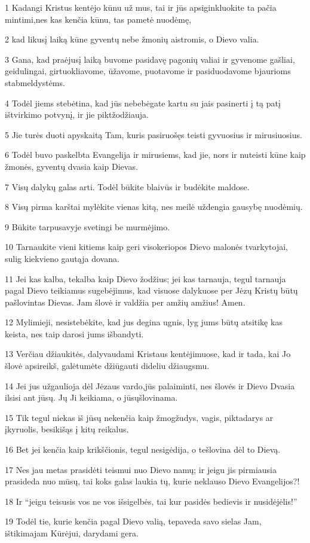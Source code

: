 \par 1 Kadangi Kristus kentėjo kūnu už mus, tai ir jūs apsiginkluokite ta pačia mintimi,­nes kas kenčia kūnu, tas pametė nuodėmę, 
\par 2 kad likusį laiką kūne gyventų nebe žmonių aistromis, o Dievo valia. 
\par 3 Gana, kad praėjusį laiką buvome pasidavę pagonių valiai ir gyvenome gašliai, geidulingai, girtuokliavome, ūžavome, puotavome ir pasiduodavome bjaurioms stabmeldystėms. 
\par 4 Todėl jiems stebėtina, kad jūs nebebėgate kartu su jais pasinerti į tą patį ištvirkimo potvynį, ir jie piktžodžiauja. 
\par 5 Jie turės duoti apyskaitą Tam, kuris pasiruošęs teisti gyvuosius ir mirusiuosius. 
\par 6 Todėl buvo paskelbta Evangelija ir mirusiems, kad jie, nors ir nuteisti kūne kaip žmonės, gyventų dvasia kaip Dievas. 
\par 7 Visų dalykų galas arti. Todėl būkite blaivūs ir budėkite maldose. 
\par 8 Visų pirma karštai mylėkite vienas kitą, nes meilė uždengia gausybę nuodėmių. 
\par 9 Būkite tarpusavyje svetingi be murmėjimo. 
\par 10 Tarnaukite vieni kitiems kaip geri visokeriopos Dievo malonės tvarkytojai, sulig kiekvieno gautąja dovana. 
\par 11 Jei kas kalba, tekalba kaip Dievo žodžius; jei kas tarnauja, tegul tarnauja pagal Dievo teikiamus sugebėjimus, kad visuose dalykuose per Jėzų Kristų būtų pašlovintas Dievas. Jam šlovė ir valdžia per amžių amžius! Amen. 
\par 12 Mylimieji, nesistebėkite, kad jus degina ugnis, lyg jums būtų atsitikę kas keista, nes taip darosi jums išbandyti. 
\par 13 Verčiau džiaukitės, dalyvaudami Kristaus kentėjimuose, kad ir tada, kai Jo šlovė apsireikš, galėtumėte džiūgauti dideliu džiaugsmu. 
\par 14 Jei jus užgaulioja dėl Jėzaus vardo,­jūs palaiminti, nes šlovės ir Dievo Dvasia ilsisi ant jūsų. Jų Ji keikiama, o jūsų­šlovinama. 
\par 15 Tik tegul niekas iš jūsų nekenčia kaip žmogžudys, vagis, piktadarys ar įkyruolis, besikišąs į kitų reikalus. 
\par 16 Bet jei kenčia kaip krikščionis, tegul nesigėdija, o tešlovina dėl to Dievą. 
\par 17 Nes jau metas prasidėti teismui nuo Dievo namų; ir jeigu jis pirmiausia prasideda nuo mūsų, tai koks galas laukia tų, kurie neklauso Dievo Evangelijos?! 
\par 18 Ir “jeigu teisusis vos ne vos išsigelbės, tai kur pasidės bedievis ir nusidėjėlis!” 
\par 19 Todėl tie, kurie kenčia pagal Dievo valią, tepaveda savo sielas Jam, ištikimajam Kūrėjui, darydami gera.


